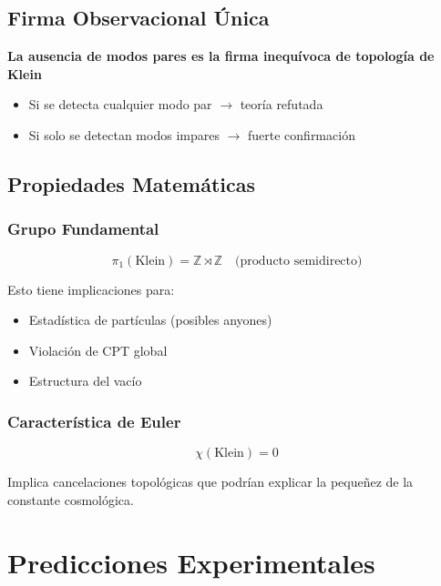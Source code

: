 \documentclass[12pt,a4paper]{article}
\begin{document}
\subsection{Firma Observacional Única}

\textbf{La ausencia de modos pares es la firma inequívoca de topología de Klein}

\begin{itemize}
    \item Si se detecta cualquier modo par $\rightarrow$ teoría refutada
    \item Si solo se detectan modos impares $\rightarrow$ fuerte confirmación
\end{itemize}

\subsection{Propiedades Matemáticas}

\subsubsection{Grupo Fundamental}

\begin{equation}
\pi_1(\text{Klein}) = \mathbb{Z} \rtimes \mathbb{Z} \quad \text{(producto semidirecto)}
\end{equation}

Esto tiene implicaciones para:
\begin{itemize}
    \item Estadística de partículas (posibles anyones)
    \item Violación de CPT global
    \item Estructura del vacío
\end{itemize}

\subsubsection{Característica de Euler}

\begin{equation}
\chi(\text{Klein}) = 0
\end{equation}

Implica cancelaciones topológicas que podrían explicar la pequeñez de la constante cosmológica.

\section{Predicciones Experimentales}
\label{sec:predicciones}
\end{document}
